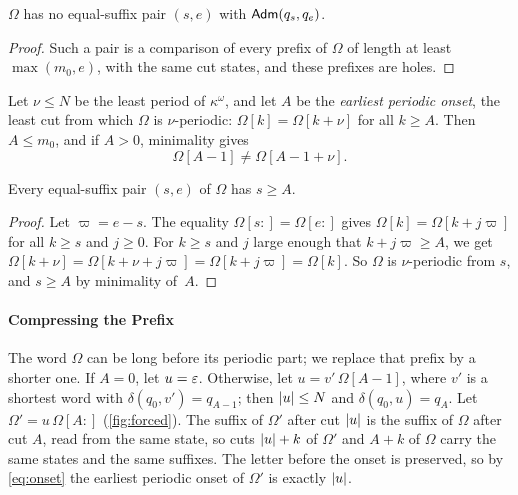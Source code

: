 \begin{lemma}\label{lem:no-infinite}
$\Omega$ has no equal-suffix pair $(s,e)$ with $\mathsf{Adm}(q_s,q_e)$.
\end{lemma}

\begin{proof}
Such a pair is a comparison of every prefix of $\Omega$ of length at least $\max(m_0,e)$, with
the same cut states, and these prefixes are holes.
\end{proof}

Let $\nu \le N$ be the least period of $\kappa^\omega$, and let $A$ be the \emph{earliest
periodic onset}, the least cut from which $\Omega$ is $\nu$-periodic: $\Omega[k] = \Omega[k+\nu]$ for all
$k \ge A$. Then $A \le m_0$, and if $A > 0$, minimality gives
\begin{equation}\label{eq:onset}
  \Omega[A-1] \ne \Omega[A-1+\nu].
\end{equation}

\begin{lemma}\label{lem:onset}
Every equal-suffix pair $(s,e)$ of $\Omega$ has $s \ge A$.
\end{lemma}

\begin{proof}
Let $\varpi = e - s$. The equality $\Omega[s{:}] = \Omega[e{:}]$ gives $\Omega[k] = \Omega[k + j\varpi]$ for all
$k \ge s$ and $j \ge 0$. For $k \ge s$ and $j$ large enough that $k + j\varpi \ge A$, we get
$\Omega[k+\nu] = \Omega[k+\nu+j\varpi] = \Omega[k+j\varpi] = \Omega[k]$. So $\Omega$ is $\nu$-periodic from $s$, and $s \ge A$ by
minimality of~$A$.
\end{proof}

\paragraph{Compressing the Prefix}
The word $\Omega$ can be long before its periodic part; we replace that prefix by a shorter one. If
$A = 0$, let $u = \varepsilon$. Otherwise, let $u = v'\,\Omega[A-1]$, where $v'$ is a shortest word with
$\delta(q_0,v') = q_{A-1}$; then $\lvert u\rvert \le N$ and $\delta(q_0,u) = q_A$. Let
$\Omega' = u\,\Omega[A{:}]$ (\cref{fig:forced}). The suffix of $\Omega'$ after cut $\lvert u\rvert$ is the suffix
of $\Omega$ after cut $A$, read from the same state, so cuts $\lvert u\rvert+k$ of $\Omega'$ and $A+k$ of
$\Omega$ carry the same states and the same suffixes. The letter before the onset is preserved,
so by \eqref{eq:onset} the earliest periodic onset of $\Omega'$ is exactly $\lvert u\rvert$.

